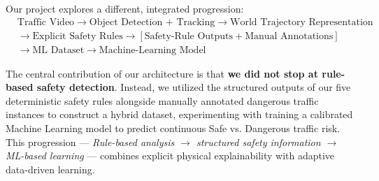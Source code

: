 Our project explores a different, integrated progression:
\begin{align*}
&\text{Traffic Video} \rightarrow \text{Object Detection + Tracking} \rightarrow \text{World Trajectory Representation} \\
&\rightarrow \text{Explicit Safety Rules} \rightarrow \left[\text{Safety-Rule Outputs} + \text{Manual Annotations}\right] \\
&\rightarrow \text{ML Dataset} \rightarrow \text{Machine-Learning Model}
\end{align*}

The central contribution of our architecture is that \textbf{we did not stop at rule-based safety detection}. Instead, we utilized the structured outputs of our five deterministic safety rules alongside manually annotated dangerous traffic instances to construct a hybrid dataset, experimenting with training a calibrated Machine Learning model to predict continuous Safe vs. Dangerous traffic risk. This progression --- \emph{Rule-based analysis $\rightarrow$ structured safety information $\rightarrow$ ML-based learning} --- combines explicit physical explainability with adaptive data-driven learning.